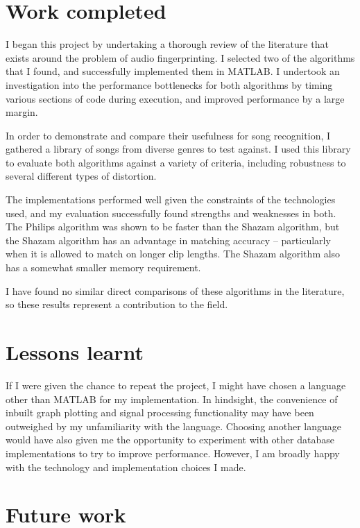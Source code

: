 \documentclass[12pt,a4paper,twoside,openright]{report}
\begin{document}
\section{Work completed}

I began this project by undertaking a thorough review of the literature that exists around the problem of audio fingerprinting. I selected two of the algorithms that I found, and successfully implemented them in MATLAB. I undertook an investigation into the performance bottlenecks for both algorithms by timing various sections of code during execution, and improved performance by a large margin.

In order to demonstrate and compare their usefulness for song recognition, I gathered a library of songs from diverse genres to test against. I used this library to evaluate both algorithms against a variety of criteria, including robustness to several different types of distortion.

The implementations performed well given the constraints of the technologies used, and my evaluation successfully found strengths and weaknesses in both. The Philips algorithm was shown to be faster than the Shazam algorithm, but the Shazam algorithm has an advantage in matching accuracy -- particularly when it is allowed to match on longer clip lengths. The Shazam algorithm also has a somewhat smaller memory requirement.

I have found no similar direct comparisons of these algorithms in the literature, so these results represent a contribution to the field.

\section{Lessons learnt}

If I were given the chance to repeat the project, I might have chosen a language other than MATLAB for my implementation. In hindsight, the convenience of inbuilt graph plotting and signal processing functionality may have been outweighed by my unfamiliarity with the language. Choosing another language would have also given me the opportunity to experiment with other database implementations to try to improve performance. However, I am broadly happy with the technology and implementation choices I made.

\section{Future work}
\end{document}
